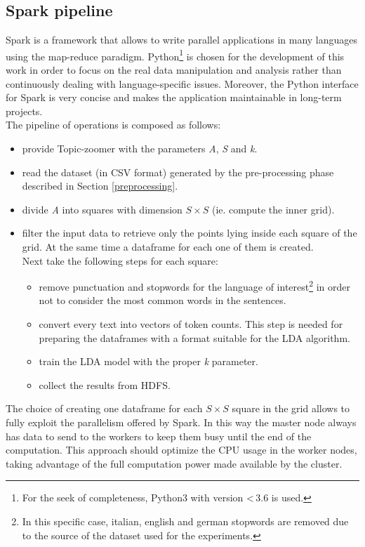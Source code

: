 \documentclass{sig-alternate-05-2015}
\begin{document}
\subsection{Spark pipeline}
Spark is a framework that allows to write parallel applications in many languages using the map-reduce paradigm. Python\footnote{For the seek of completeness, Python3 with version \textless\,3.6 is used.} is chosen for the development of this work in order to focus on the real data manipulation and analysis rather than continuously dealing with language-specific issues. Moreover, the Python interface for Spark is very concise and makes the application maintainable in long-term projects.\\
The pipeline of operations is composed as follows:
\begin{itemize}
    \item provide Topic-zoomer with the parameters \emph{A}, \emph{S} and \emph{k}.
    \item read the dataset (in CSV format) generated by the pre-processing phase described in Section \ref{preprocessing}.
    \item divide \emph{A} into squares with dimension $S \times S$ (ie. compute the inner grid).
    \item filter the input data to retrieve only the points lying inside each square of the grid. At the same time a dataframe for each one of them is created.\\
    Next take the following steps for each square:
    \begin{itemize}
        \item remove punctuation and stopwords for the language of interest\footnote{In this specific case, italian, english and german stopwords are removed due to the source of the dataset used for the experiments.} in order not to consider the most common words in the sentences.
        \item convert every text into vectors of token counts. This step is needed for preparing the dataframes with a format suitable for the LDA algorithm.
        \item train the LDA model with the proper \emph{k} parameter.
        \item collect the results from HDFS.
    \end{itemize}
\end{itemize}
The choice of creating one dataframe for each $S \times S$ square in the grid allows to fully exploit the parallelism offered by Spark. In this way the master node always has data to send to the workers to keep them busy until the end of the computation. This approach should optimize the CPU usage in the worker nodes, taking advantage of the full computation power made available by the cluster.
\end{document}
